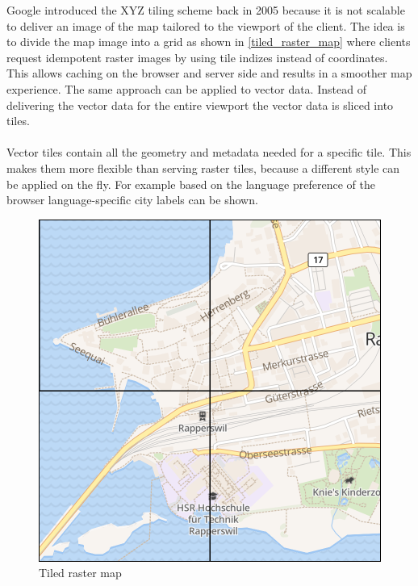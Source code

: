 \noindent\begin{minipage}[t]{0.48\linewidth}
    \vspace{0pt}
    Google introduced the XYZ tiling scheme \cite{v_1_wiki.openstreetmap.org_2015} back in 2005 because it is not scalable to deliver an image of the map tailored to the viewport of the client.
    The idea is to divide the map image into a grid as shown in \autoref{tiled_raster_map} where clients request idempotent raster images by using tile indizes instead of coordinates. This allows caching on the browser and server side and results in a smoother map experience.
    The same approach can be applied to vector data. Instead of delivering the vector data for the entire viewport the vector data is sliced into tiles.\\\\
    Vector tiles contain all the geometry and metadata needed for a specific tile. This makes them more flexible than serving raster tiles, because a different style can be applied on the fly. For example based on the language preference of the browser language-specific city labels can be shown.
\end{minipage}
\hfill
\begin{minipage}[t]{0.48\linewidth}
    \vspace{-10pt}
    \begin{figure}[H]
        \centering
        \includegraphics[width=\textwidth]{images/tiled_raster}
        \caption{Tiled raster map}
        \label{tiled_raster_map}
    \end{figure}
\end{minipage}


